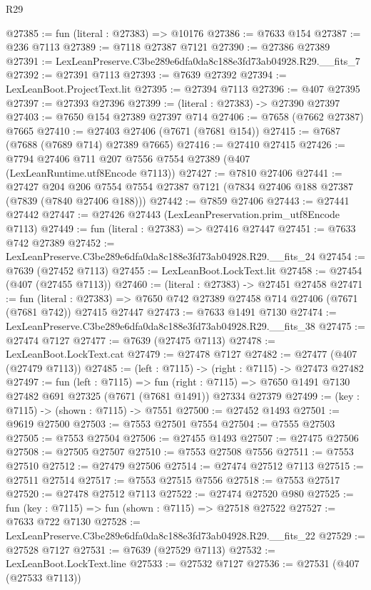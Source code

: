 \begin{lexlean}{R29}
\begin{coremodule}
@27385 := fun (literal : @27383) => @10176
@27386 := @7633 @154
@27387 := @236 @7113
@27389 := @7118 @27387 @7121
@27390 := @27386 @27389
@27391 := LexLeanPreserve.C3be289e6dfa0da8c188e3fd73ab04928.R29.__fits_7
@27392 := @27391 @7113
@27393 := @7639 @27392
@27394 := LexLeanBoot.ProjectText.lit
@27395 := @27394 @7113
@27396 := @407 @27395
@27397 := @27393 @27396
@27399 := (literal : @27383) -> @27390 @27397
@27403 := @7650 @154 @27389 @27397 @714
@27406 := @7658 (@7662 @27387) @7665
@27410 := @27403 @27406 (@7671 (@7681 @154))
@27415 := @7687 (@7688 (@7689 @714) @27389 @7665)
@27416 := @27410 @27415
@27426 := @7794 @27406 @711 @207 @7556 @7554 @27389 (@407 (LexLeanRuntime.utf8Encode @7113))
@27427 := @7810 @27406
@27441 := @27427
    @204
    @206
    @7554
    @7554
    @27387
    @7121
    (@7834 @27406 @188 @27387 (@7839 (@7840 @27406 @188)))
@27442 := @7859 @27406
@27443 := @27441 @27442
@27447 := @27426 @27443 (LexLeanPreservation.prim_utf8Encode @7113)
@27449 := fun (literal : @27383) => @27416 @27447
@27451 := @7633 @742 @27389
@27452 := LexLeanPreserve.C3be289e6dfa0da8c188e3fd73ab04928.R29.__fits_24
@27454 := @7639 (@27452 @7113)
@27455 := LexLeanBoot.LockText.lit
@27458 := @27454 (@407 (@27455 @7113))
@27460 := (literal : @27383) -> @27451 @27458
@27471 := fun (literal : @27383) =>
  @7650 @742 @27389 @27458 @714 @27406 (@7671 (@7681 @742)) @27415 @27447
@27473 := @7633 @1491 @7130
@27474 := LexLeanPreserve.C3be289e6dfa0da8c188e3fd73ab04928.R29.__fits_38
@27475 := @27474 @7127
@27477 := @7639 (@27475 @7113)
@27478 := LexLeanBoot.LockText.cat
@27479 := @27478 @7127
@27482 := @27477 (@407 (@27479 @7113))
@27485 := (left : @7115) -> (right : @7115) -> @27473 @27482
@27497 := fun (left : @7115) =>
  fun (right : @7115) => @7650 @1491 @7130 @27482 @691 @27325 (@7671 (@7681 @1491)) @27334 @27379
@27499 := (key : @7115) -> (shown : @7115) -> @7551
@27500 := @27452 @1493
@27501 := @9619 @27500
@27503 := @7553 @27501 @7554
@27504 := @7555 @27503
@27505 := @7553 @27504
@27506 := @27455 @1493
@27507 := @27475 @27506
@27508 := @27505 @27507
@27510 := @7553 @27508 @7556
@27511 := @7553 @27510
@27512 := @27479 @27506
@27514 := @27474 @27512 @7113
@27515 := @27511 @27514
@27517 := @7553 @27515 @7556
@27518 := @7553 @27517
@27520 := @27478 @27512 @7113
@27522 := @27474 @27520 @980
@27525 := fun (key : @7115) => fun (shown : @7115) => @27518 @27522
@27527 := @7633 @722 @7130
@27528 := LexLeanPreserve.C3be289e6dfa0da8c188e3fd73ab04928.R29.__fits_22
@27529 := @27528 @7127
@27531 := @7639 (@27529 @7113)
@27532 := LexLeanBoot.LockText.line
@27533 := @27532 @7127
@27536 := @27531 (@407 (@27533 @7113))

\end{coremodule}
\end{lexlean}
